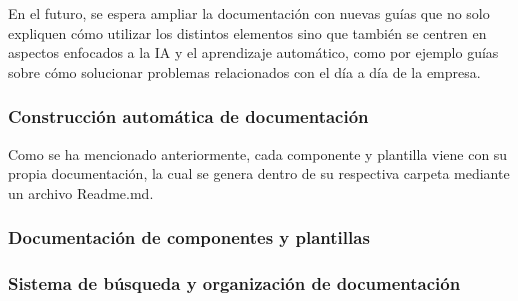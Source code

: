 En el futuro, se espera ampliar la documentación con nuevas guías
que no solo expliquen cómo utilizar los distintos elementos sino que
también se centren en aspectos enfocados a la IA y el aprendizaje
automático, como por ejemplo guías sobre cómo solucionar problemas
relacionados con el día a día de la empresa.

\subsubsection{Construcción automática de documentación}
Como se ha mencionado anteriormente, cada componente y plantilla 
viene con su propia documentación, la cual se genera dentro de su
respectiva carpeta mediante un archivo Readme.md. 

\subsubsection{Documentación de componentes y plantillas}

\subsubsection{Sistema de búsqueda y organización de documentación}

